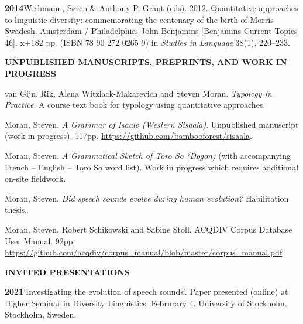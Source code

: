 \documentclass[11pt]{article}
\newcommand{\hangpara}{
 \setlength{\parindent}{0in} %
 \hangindent=0.42in %
}
\begin{document}

\hangpara
{\bf 2014}\hspace{1ex}Wichmann, S{\o}ren \& Anthony P. Grant (eds). 2012. Quantitative approaches to linguistic diversity: commemorating the centenary of the birth of Morris Swadesh. Amsterdam / Philadelphia: John Benjamins [Benjamins Current Topics 46]. x+182 pp. (ISBN 78 90 272 0265 9) in \textit{Studies in Language} 38(1), 220--233.

\vskip 20pt
\begin{flushleft}
{\bf UNPUBLISHED MANUSCRIPTS, PREPRINTS, AND WORK IN PROGRESS}
\end{flushleft}

\hangpara
van Gijn, Rik, Alena Witzlack-Makarevich and Steven Moran. {\it Typology in Practice}. A course text book for typology using quantitative approaches.

\vskip 6pt
\hangpara
Moran, Steven. \textit{A Grammar of Isaalo (Western Sisaala)}. Unpublished manuscript (work in progress). 117pp. \url{https://github.com/bambooforest/sisaala}.

\vskip 6pt
\hangpara
Moran, Steven. \textit{A Grammatical Sketch of Toro So (Dogon)} (with accompanying French -- English -- Toro So word list). Work in progress which requires additional on-site fieldwork. 

\vskip 6pt
\hangpara
Moran, Steven. \textit{Did speech sounds evolve during human evolution?} Habilitation thesis.

\vskip 6pt
\hangpara
Moran, Steven, Robert Schikowski and Sabine Stoll. ACQDIV Corpus Database User Manual. 92pp. \url{https://github.com/acqdiv/corpus_manual/blob/master/corpus_manual.pdf}



\vskip 20pt
\begin{flushleft}
{\bf INVITED PRESENTATIONS}
\end{flushleft}

\hangpara
{\bf 2021}\hspace{1ex}`Investigating the evolution of speech sounds'. Paper presented (online) at Higher Seminar in Diversity Linguistics. Februrary 4. University of Stockholm, Stockholm, Sweden.
\end{document}
